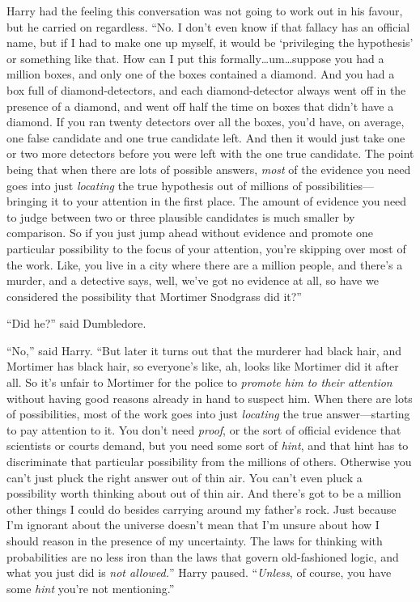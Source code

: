 Harry had the feeling this conversation was not going to work out in his favour, but he carried on regardless.
“No. I don’t even know if that fallacy has an official name, but if I had to make one up myself, it would be ‘privileging the hypothesis’ or something like that. How can I put this formally…um…suppose you had a million boxes, and only one of the boxes contained a diamond. And you had a box full of diamond-detectors, and each diamond-detector always went off in the presence of a diamond, and went off half the time on boxes that didn’t have a diamond. If you ran twenty detectors over all the boxes, you’d have, on average, one false candidate and one true candidate left. And then it would just take one or two more detectors before you were left with the one true candidate. The point being that when there are lots of possible answers, \emph{most} of the evidence you need goes into just \emph{locating} the true hypothesis out of millions of possibilities—bringing it to your attention in the first place. The amount of evidence you need to judge between two or three plausible candidates is much smaller by comparison. So if you just jump ahead without evidence and promote one particular possibility to the focus of your attention, you’re skipping over most of the work. Like, you live in a city where there are a million people, and there’s a murder, and a detective says, well, we’ve got no evidence at all, so have we considered the possibility that Mortimer Snodgrass did it?”

“Did he?” said Dumbledore.

“No,” said Harry.
“But later it turns out that the murderer had black hair, and Mortimer has black hair, so everyone’s like, ah, looks like Mortimer did it after all. So it’s unfair to Mortimer for the police to \emph{promote him to their attention} without having good reasons already in hand to suspect him. When there are lots of possibilities, most of the work goes into just \emph{locating} the true answer—starting to pay attention to it. You don’t need \emph{proof}, or the sort of official evidence that scientists or courts demand, but you need some sort of \emph{hint}, and that hint has to discriminate that particular possibility from the millions of others. Otherwise you can’t just pluck the right answer out of thin air. You can’t even pluck a possibility worth thinking about out of thin air. And there’s got to be a million other things I could do besides carrying around my father’s rock. Just because I’m ignorant about the universe doesn’t mean that I’m unsure about how I should reason in the presence of my uncertainty. The laws for thinking with probabilities are no less iron than the laws that govern old-fashioned logic, and what you just did is \emph{not allowed.}” Harry paused. “\emph{Unless}, of course, you have some \emph{hint} you’re not mentioning.”

